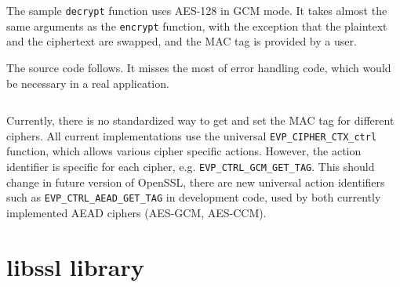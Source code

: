 The sample \texttt{decrypt} function uses AES-128 in GCM mode. It takes almost the same arguments as the \texttt{encrypt} function, with the exception that the plaintext and the ciphertext are swapped, and the MAC tag is provided by a user.

The source code follows. It misses the most of error handling code, which would be necessary in a real application.

\inputminted{c}{code/openssl-evp-aead-decrypt.c}

Currently, there is no standardized way to get and set the MAC tag for different ciphers. All current implementations use the universal \texttt{EVP\_CIPHER\_CTX\_ctrl} function, which allows various cipher specific actions. However, the action identifier is specific for each cipher, e.g. \texttt{EVP\_CTRL\_GCM\_GET\_TAG}. This should change in future version of OpenSSL, there are new universal action identifiers such as \texttt{EVP\_CTRL\_AEAD\_GET\_TAG} in development code, used by both currently implemented AEAD ciphers (AES-GCM, AES-CCM).


\section{libssl library}
